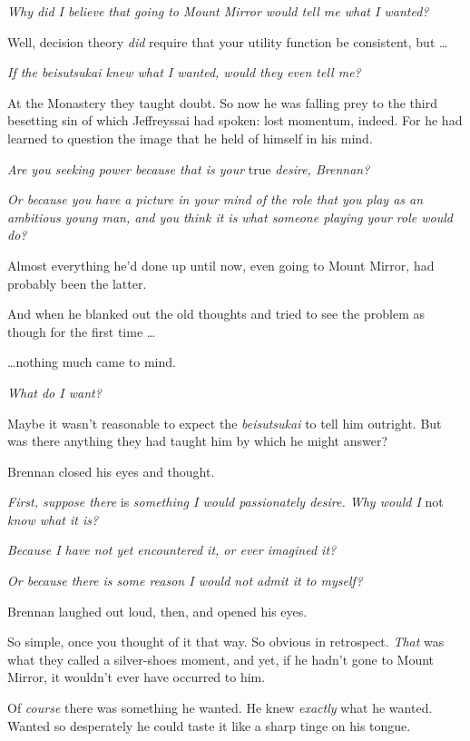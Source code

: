 {
 \textit{Why did I believe that going to Mount Mirror would tell me
what I wanted?}}

{
 Well, decision theory \textit{did} require that your utility
function be consistent, but \ldots}

{
 \textit{If the beisutsukai knew what I wanted, would they even
tell me?}}

{
 At the Monastery they taught doubt. So now he was falling prey to
the third besetting sin of which Jeffreyssai had spoken: lost momentum,
indeed. For he had learned to question the image that he held of
himself in his mind.}

{
 \textit{Are you seeking power because that is your} true
\textit{desire, Brennan?}}

{
 \textit{Or because you have a picture in your mind of the role}
\textit{that you play as an ambitious young man, and you think it is
what someone playing your role would do?}}

{
 Almost everything he'd done up until now, even
going to Mount Mirror, had probably been the latter.}

{
 And when he blanked out the old thoughts and tried to see the
problem as though for the first time \ldots}

{
 \ldots nothing much came to mind.}

{
 \textit{What do I want?}}

{
 Maybe it wasn't reasonable to expect the
\textit{beisutsukai} to tell him outright. But was there anything they
had taught him by which he might answer?}

{
 Brennan closed his eyes and thought.}

{
 \textit{First, suppose there} is \textit{something I would
passionately desire. Why would I} not \textit{know what it is?}}

{
 \textit{Because I have not yet encountered it, or ever imagined
it?}}

{
 \textit{Or because there is some reason I would not admit it to
myself?}}

{
 Brennan laughed out loud, then, and opened his eyes.}

{
 So simple, once you thought of it that way. So obvious in
retrospect. \textit{That} was what they called a silver-shoes moment,
and yet, if he hadn't gone to Mount Mirror, it
wouldn't ever have occurred to him.}

{
 Of \textit{course} there was something he wanted. He knew
\textit{exactly} what he wanted. Wanted so desperately he could taste
it like a sharp tinge on his tongue.}

